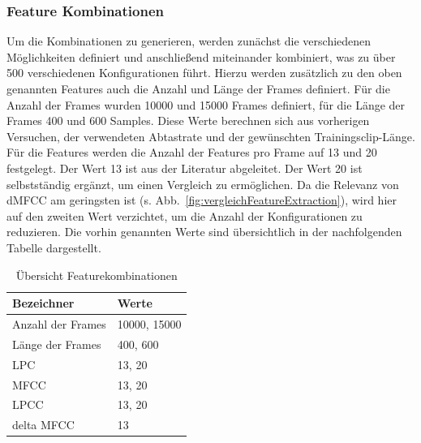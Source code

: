 \subsubsection{Feature Kombinationen}

Um die Kombinationen zu generieren, werden zunächst die verschiedenen Möglichkeiten definiert und anschließend miteinander kombiniert, was zu über 500 verschiedenen Konfigurationen führt.
Hierzu werden zusätzlich zu den oben genannten Features auch die Anzahl und Länge der Frames definiert.
Für die Anzahl der Frames wurden 10000 und 15000 Frames definiert, für die Länge der Frames 400 und 600 Samples.
Diese Werte berechnen sich aus vorherigen Versuchen, der verwendeten Abtastrate und der gewünschten Trainingsclip-Länge.
Für die Features werden die Anzahl der Features pro Frame auf 13 und 20 festgelegt.
Der Wert 13 ist aus der Literatur abgeleitet. %
Der Wert 20 ist selbstständig ergänzt, um einen Vergleich zu ermöglichen.
Da die Relevanz von \ac{dMFCC} am geringsten ist (s. Abb.~\ref{fig:vergleichFeatureExtraction}), wird hier auf den zweiten Wert verzichtet, um die Anzahl der Konfigurationen zu reduzieren.
Die vorhin genannten Werte sind übersichtlich in der nachfolgenden Tabelle dargestellt.
\begin{table}[H]
    \centering
    \begin{tabular}{l|l}
        \textbf{Bezeichner} & \textbf{Werte}   \\ \hline
        Anzahl der Frames   & 10000, 15000 \\ \hline
        Länge der Frames    & 400, 600     \\ \hline
        LPC                 & 13, 20       \\ \hline
        MFCC                & 13, 20       \\ \hline
        LPCC                & 13, 20       \\ \hline
        delta MFCC          & 13          
    \end{tabular}
    \caption{Übersicht Featurekombinationen}
\end{table}


